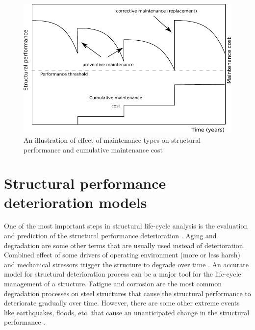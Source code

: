 \begin{figure}[hbt!]
\centering
  \includegraphics[width=0.75\linewidth]{figures/fig-ch1/maintenannceeffects.pdf}
  \caption{An illustration of effect of maintenance types on structural performance and cumulative maintenance cost}
  \label{fig:maintenanceffect}
\end{figure}


\section{Structural performance deterioration models}

\noindent
One of the most important steps in structural life-cycle analysis is the evaluation and prediction of the structural performance deterioration \citep{Frang2011, Farngbook2018}. 
Aging and degradation are some other terms that are usually used instead of deterioration. Combined effect of some drivers of operating environment (more or less harsh) and
mechanical stressors trigger the structure to degrade over time \citep{Farngbook2019}. An accurate model for structural deterioration process can be a major tool for the 
life-cycle management of a structure. Fatigue and corrosion are the most common degradation processes on steel structures that cause the 
structural performance to deteriorate gradually over time. However, there are some other extreme events like earthquakes, floods, etc. that cause an unanticipated change 
in the structural performance \citep{fransoli2016}. 

